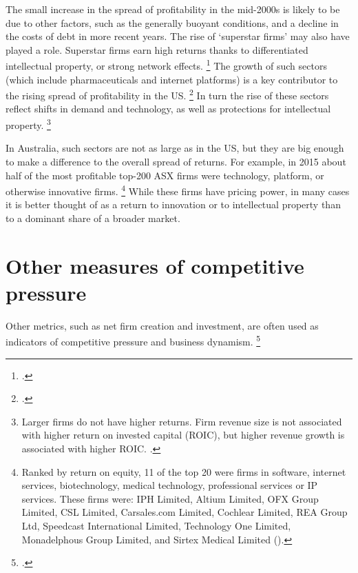 The small increase in the spread of profitability in the mid-2000s is likely to be due to other factors, such as the generally buoyant conditions, and a decline in the costs of debt in more recent years. The rise of `superstar firms' may also have played a role. Superstar firms earn high returns thanks to differentiated intellectual property, or strong network effects.%
    \footcites{UNCTAD_2017}{AutorDorn2017}
The growth of such sectors (which include pharmaceuticals and internet platforms) is a key contributor to the rising spread of profitability in the US.%
    \footcite[][71--76]{Koller_ROIC_2010}
In turn the rise of these sectors reflect shifts in demand and technology, as well as protections for intellectual property.%
    \footnote{Larger firms do not have higher returns. Firm revenue size is not associated with higher return on invested capital (ROIC), but higher revenue growth is associated with higher ROIC. \textcite{Koller_ROIC_2010}.}

In Australia, such sectors are not as large as in the US, but they are big enough to make a difference to the overall spread of returns. For example, in 2015 about half of the most profitable top-200 ASX firms were technology, platform, or otherwise innovative firms.%
    \footnote{Ranked by return on equity, 11 of the top 20 were firms in software, internet services, biotechnology, medical technology, professional services or IP services. These firms were: IPH Limited, Altium Limited, OFX Group Limited, CSL Limited, Carsales.com Limited, Cochlear Limited, REA Group Ltd, Speedcast International Limited, Technology One Limited, Monadelphous Group Limited, and Sirtex Medical Limited (\textcite{Morningstar2017}).}
While these firms  have pricing power, in many cases it is better thought of as a return to innovation or to intellectual property than to a dominant share of a broader market.%

\section{Other measures of competitive pressure}

Other metrics, such as net firm creation and investment, are often used as indicators of competitive pressure and business dynamism.%
\footcites{CEAcompetitionbriefmay2016}{Leigh-triggs-AER}

